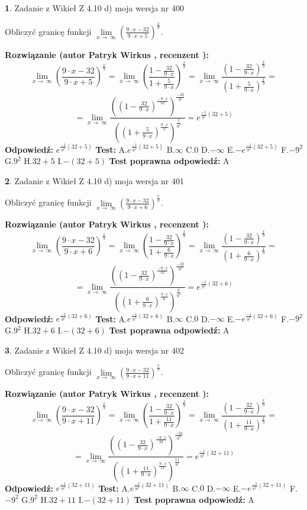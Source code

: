 \documentclass[12pt, a4paper]{article}
\theoremstyle{definition} %
\newtheorem{zad}{}
\newcommand{\zadStart}[1]{\begin{zad}#1\newline}
\newcommand{\zadStop}{\end{zad}}
\newcommand{\rozwStart}[2]{\noindent \textbf{Rozwiązanie (autor #1 , recenzent #2): }\newline}
\newcommand{\rozwStop}{\newline}
\newcommand{\odpStart}{\noindent \textbf{Odpowiedź:}\newline}
\newcommand{\odpStop}{\newline}
\newcommand{\testStart}{\noindent \textbf{Test:}\newline}
\newcommand{\testStop}{\newline}
\newcommand{\kluczStart}{\noindent \textbf{Test poprawna odpowiedź:}\newline}
\newcommand{\kluczStop}{\newline}
\begin{document}
\zadStart{Zadanie z Wikieł Z 4.10 d) moja wersja nr 400}


Obliczyć granicę funkcji  $\lim\limits_{x\to\ \infty}(\frac{9\cdot x-32}{9\cdot x+5})^{\frac{x}{9}}$.
\zadStop
\rozwStart{Patryk Wirkus}{}
$$\lim\limits_{x\to\ \infty}(\frac{9\cdot x-32}{9\cdot x+5})^{\frac{x}{9}} = \lim\limits_{x\to\ \infty}(\frac{1-\frac{32}{9\cdot x}}{1+\frac{5}{9\cdot x}})^{\frac{x}{9}}=\lim\limits_{x\to\ \infty}\frac{(1-\frac{32}{9\cdot x})^{\frac{x}{9}}}{(1+\frac{5}{9\cdot x})^{\frac{x}{9}}}=$$
$$=\lim\limits_{x\to\ \infty}\frac{((1-\frac{32}{9\cdot x})^{\frac{-9\cdot x}{32}})^{\frac{-32}{9^{2}}}}{((1+\frac{5}{9\cdot x})^{\frac{9\cdot x}{5}})^{\frac{5}{9^{2}}}}=e^{\frac{-1}{9^{2}}(32+5)}$$
\rozwStop
\odpStart
$e^{\frac{-1}{9^{2}}(32+5)}$
\odpStop
\testStart
A.$e^{\frac{-1}{9^{2}}(32+5)}$ B.$\infty$ C.$0$ D.$-\infty$ E.$-e^{\frac{-1}{9^{2}}(32+5)}$
F.$-9^{2}$ G.$9^{2}$
H.$32+5$
I.$-(32+5)$
\testStop
\kluczStart
A
\kluczStop



\zadStart{Zadanie z Wikieł Z 4.10 d) moja wersja nr 401}


Obliczyć granicę funkcji  $\lim\limits_{x\to\ \infty}(\frac{9\cdot x-32}{9\cdot x+6})^{\frac{x}{9}}$.
\zadStop
\rozwStart{Patryk Wirkus}{}
$$\lim\limits_{x\to\ \infty}(\frac{9\cdot x-32}{9\cdot x+6})^{\frac{x}{9}} = \lim\limits_{x\to\ \infty}(\frac{1-\frac{32}{9\cdot x}}{1+\frac{6}{9\cdot x}})^{\frac{x}{9}}=\lim\limits_{x\to\ \infty}\frac{(1-\frac{32}{9\cdot x})^{\frac{x}{9}}}{(1+\frac{6}{9\cdot x})^{\frac{x}{9}}}=$$
$$=\lim\limits_{x\to\ \infty}\frac{((1-\frac{32}{9\cdot x})^{\frac{-9\cdot x}{32}})^{\frac{-32}{9^{2}}}}{((1+\frac{6}{9\cdot x})^{\frac{9\cdot x}{6}})^{\frac{6}{9^{2}}}}=e^{\frac{-1}{9^{2}}(32+6)}$$
\rozwStop
\odpStart
$e^{\frac{-1}{9^{2}}(32+6)}$
\odpStop
\testStart
A.$e^{\frac{-1}{9^{2}}(32+6)}$ B.$\infty$ C.$0$ D.$-\infty$ E.$-e^{\frac{-1}{9^{2}}(32+6)}$
F.$-9^{2}$ G.$9^{2}$
H.$32+6$
I.$-(32+6)$
\testStop
\kluczStart
A
\kluczStop



\zadStart{Zadanie z Wikieł Z 4.10 d) moja wersja nr 402}


Obliczyć granicę funkcji  $\lim\limits_{x\to\ \infty}(\frac{9\cdot x-32}{9\cdot x+11})^{\frac{x}{9}}$.
\zadStop
\rozwStart{Patryk Wirkus}{}
$$\lim\limits_{x\to\ \infty}(\frac{9\cdot x-32}{9\cdot x+11})^{\frac{x}{9}} = \lim\limits_{x\to\ \infty}(\frac{1-\frac{32}{9\cdot x}}{1+\frac{11}{9\cdot x}})^{\frac{x}{9}}=\lim\limits_{x\to\ \infty}\frac{(1-\frac{32}{9\cdot x})^{\frac{x}{9}}}{(1+\frac{11}{9\cdot x})^{\frac{x}{9}}}=$$
$$=\lim\limits_{x\to\ \infty}\frac{((1-\frac{32}{9\cdot x})^{\frac{-9\cdot x}{32}})^{\frac{-32}{9^{2}}}}{((1+\frac{11}{9\cdot x})^{\frac{9\cdot x}{11}})^{\frac{11}{9^{2}}}}=e^{\frac{-1}{9^{2}}(32+11)}$$
\rozwStop
\odpStart
$e^{\frac{-1}{9^{2}}(32+11)}$
\odpStop
\testStart
A.$e^{\frac{-1}{9^{2}}(32+11)}$ B.$\infty$ C.$0$ D.$-\infty$ E.$-e^{\frac{-1}{9^{2}}(32+11)}$
F.$-9^{2}$ G.$9^{2}$
H.$32+11$
I.$-(32+11)$
\testStop
\kluczStart
A
\kluczStop
\end{document}
